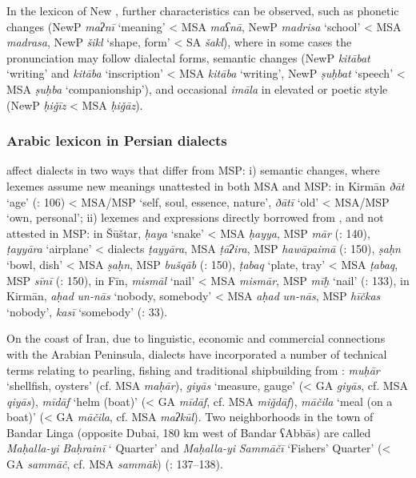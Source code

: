 \documentclass[output=paper]{langsci/langscibook}
\begin{document}
In the  lexicon of New , further characteristics can be observed, such as phonetic changes (NewP \textit{maʔnī} ‘meaning’ < MSA \textit{maʕnā}, NewP \textit{madrisa} ‘school’ < MSA \textit{madrasa}, NewP \textit{šikl} ‘shape, form’ < SA \textit{šakl}), where in some cases the  pronunciation may follow  dialectal forms, semantic changes (NewP \textit{kitābat} ‘writing’ and \textit{kitāba} ‘inscription’ < MSA \textit{kitāba} ‘writing’, NewP \textit{ṣuḥbat} ‘speech’ < MSA \textit{ṣuḥba} ‘companionship’), and occasional \textit{imāla} in elevated or poetic style (NewP \textit{ḥiǧīz} < MSA \textit{ḥiǧāz}).

\subsubsection{Arabic lexicon in Persian dialects}

  affect  dialects in two ways that differ from MSP: i) semantic changes, where  lexemes assume new meanings unattested in both MSA and MSP: in Kirmān \textit{ðāt} ‘age’   (\citealt{Ṣarrāfī1996}: 106) < MSA/MSP ‘self, soul, essence, nature’, \textit{ðātī} ‘old’ < MSA/MSP ‘own, personal’; ii) lexemes and expressions directly borrowed from , and not attested in MSP: in Šūštar, \textit{ḥaya} ‘snake’ < MSA \textit{ḥayya}, MSP \textit{mār} (\citealt{Fāẓilī2004}: 140), \textit{ṭayyāra} ‘airplane’ <  dialects \textit{ṭayyāra}, MSA \textit{ṭāʔira}, MSP \textit{hawāpaimā} (\citealt{Fāẓilī2004}: 150), \textit{ṣaḥn} ‘bowl, dish’ < MSA \textit{ṣaḥn}, MSP \textit{bušqāb} (\citealt{Fāẓilī2004}: 150), \textit{ṭabaq} ‘plate, tray’ < MSA \textit{ṭabaq}, MSP \textit{sīnī} (\citealt{Fāẓilī2004}: 150), in Fīn, \textit{mismāl} ‘nail’ < MSA \textit{mismār}, MSP \textit{mīḫ} ‘nail’ (\citealt{NaǧībiFīni2002}: 133), in Kirmān, \textit{aḥad} \textit{un-nās} ‘nobody, somebody’ < MSA \textit{aḥad} \textit{un-nās}, MSP \textit{hīčkas} ‘nobody’, \textit{kasī} ‘somebody’ (\citealt{Ṣarrāfī1996}: 33).

On the   coast of Iran, due to linguistic, economic and commercial connections with the Arabian Peninsula,  dialects have incorporated a number of  technical terms relating to pearling, fishing and traditional shipbuilding from  : \textit{muḥār} ‘shellfish, oysters’ (cf. MSA \textit{maḥār}), \textit{giyās} ‘measure, gauge’ (< GA \textit{giyās}, cf. MSA \textit{qiyās}), \textit{mīdāf} ‘helm (boat)’ (< GA \textit{mīdāf}, cf. MSA \textit{miǧdāf}), \textit{māčila} ‘meal (on a boat)’ (< GA \textit{māčila}, cf. MSA \textit{maʔkūl}). Two neighborhoods in the town of Bandar Linga (opposite Dubai, 180 km west of Bandar ʕAbbās) are called \textit{Maḥalla-yi} \textit{Baḥrainī} ‘ Quarter’ and \textit{Maḥalla-yi} \textit{Sammāčī} ‘Fishers’ Quarter’ (< GA \textit{sammāč}, cf. MSA \textit{sammāk}) (\citealt{Baḫtiyārī1990}: 137–138).
\end{document}
